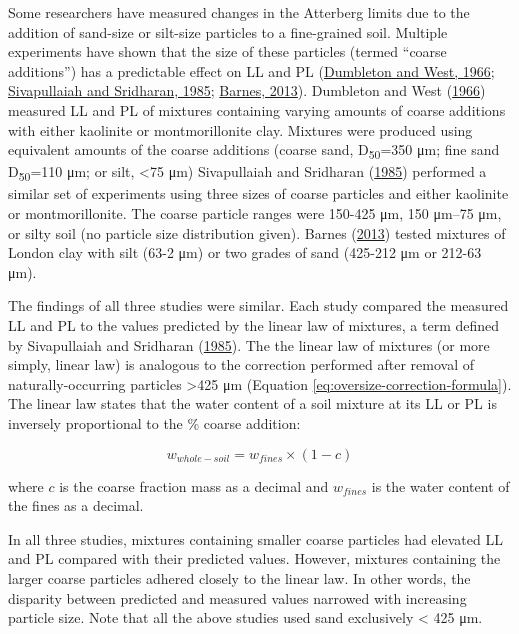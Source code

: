 \documentclass[
  letterpaper,
]{article}
\begin{document}
Some researchers have measured changes in the Atterberg limits due to the addition of sand-size or silt-size particles to a fine-grained soil.
Multiple experiments have shown that the size of these particles (termed ``coarse additions'') has a predictable effect on LL and PL (\protect\hyperlink{ref-Dumbleton1966b}{Dumbleton and West, 1966}; \protect\hyperlink{ref-Sivapullaiah1985}{Sivapullaiah and Sridharan, 1985}; \protect\hyperlink{ref-Barnes2013}{Barnes, 2013}).
Dumbleton and West (\protect\hyperlink{ref-Dumbleton1966b}{1966}) measured LL and PL of mixtures containing varying amounts of coarse additions with either kaolinite or montmorillonite clay.
Mixtures were produced using equivalent amounts of the coarse additions (coarse sand, D\textsubscript{50}=350 μm; fine sand D\textsubscript{50}=110 μm; or silt, \textless75 μm)
Sivapullaiah and Sridharan (\protect\hyperlink{ref-Sivapullaiah1985}{1985}) performed a similar set of experiments using three sizes of coarse particles and either kaolinite or montmorillonite. The coarse particle ranges were 150-425 μm, 150 μm--75 μm, or silty soil (no particle size distribution given).
Barnes (\protect\hyperlink{ref-Barnes2013}{2013}) tested mixtures of London clay with silt (63-2 μm) or two grades of sand (425-212 μm or 212-63 μm).

The findings of all three studies were similar.
Each study compared the measured LL and PL to the values predicted by the linear law of mixtures, a term defined by Sivapullaiah and Sridharan (\protect\hyperlink{ref-Sivapullaiah1985}{1985}).
The the linear law of mixtures (or more simply, linear law) is analogous to the correction performed after removal of naturally-occurring particles \textgreater425 μm (Equation \eqref{eq:oversize-correction-formula}).
The linear law states that the water content of a soil mixture at its LL or PL is inversely proportional to the \% coarse addition:

\begin{equation}
w_{whole-soil} =  w_{fines} \times (1 - c)
\label{eq:linear-law-of-mixtures}
\end{equation}

where \(c\) is the coarse fraction mass as a decimal and \(w_{fines}\) is the water content of the fines as a decimal.

In all three studies, mixtures containing smaller coarse particles had elevated LL and PL compared with their predicted values.
However, mixtures containing the larger coarse particles adhered closely to the linear law.
In other words, the disparity between predicted and measured values narrowed with increasing particle size.
Note that all the above studies used sand exclusively \textless{} 425 μm.
\end{document}
